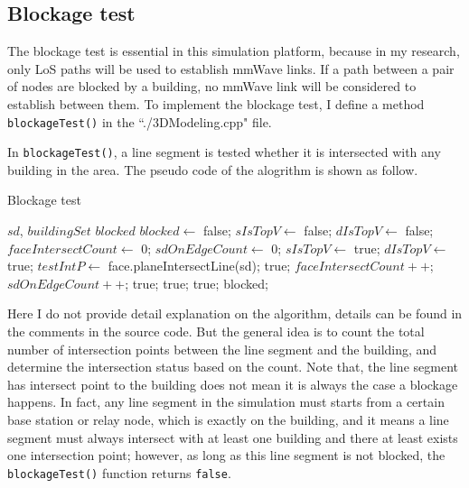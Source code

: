 \documentclass[paper=a4, fontsize=11pt]{scrartcl}
\numberwithin{equation}{section}		%
\numberwithin{figure}{section}			%
\numberwithin{table}{section}				%
\begin{document}
\subsection{Blockage test}
The blockage test is essential in this simulation platform, because in my research, only LoS paths will be used to establish mmWave links. If a path between a pair of nodes are blocked by a building, no mmWave link will be considered to establish between them. To implement the blockage test, I define a method \verb|blockageTest()| in the ``./3DModeling.cpp" file.

In \verb|blockageTest()|, a line segment is tested whether it is intersected with any building in the area. The pseudo code of the alogrithm is shown as follow.
\begin{algorithm}[!ht]
	\caption{Blockage test}
	{\fontsize{10}{10}\selectfont
		\begin{algorithmic}[1]
			\renewcommand{\algorithmicrequire}{\textbf{Input:}}
			\renewcommand{\algorithmicensure}{\textbf{Output:}}
			\REQUIRE $sd$, $buildingSet$
			\ENSURE  $blocked$
			\STATE $blocked \leftarrow$ false;
			\STATE $sIsTopV \leftarrow$ false; $dIsTopV\leftarrow$ false;
			\STATE $faceIntersectCount \leftarrow$ 0; $sdOnEdgeCount \leftarrow$ 0;
			\STATE $sIsTopV \leftarrow$ true;
			\ENDIF
			\STATE $dIsTopV \leftarrow$ true;
			\ENDIF
			\STATE $testIntP \leftarrow$ face.planeIntersectLine(sd);
			\RETURN true;
			\ELSE
			\STATE $faceIntersectCount++$;
			\STATE $sdOnEdgeCount++$;
			\ENDIF
			\ENDIF
			\ENDIF
			\ENDIF
			\ENDFOR
			\RETURN true;
			\ENDIF
			\RETURN true;
			\ENDIF
			\ENDIF
			\RETURN true;
			\ENDIF
			\ENDIF
			\ENDIF
			\ENDFOR
			\RETURN blocked;
		\end{algorithmic}
		}
\end{algorithm}

Here I do not provide detail explanation on the algorithm, details can be found in the comments in the source code. But the general idea is to count the total number of intersection points between the line segment and the building, and determine the intersection status based on the count. Note that, the line segment has intersect point to the building does not mean it is always the case a blockage happens. In fact, any line segment in the simulation must starts from a certain base station or relay node, which is exactly on the building, and it means a line segment must always intersect with at least one building and there at least exists one intersection point; however, as long as this line segment is not blocked, the \verb|blockageTest()| function returns \verb|false|.
\end{document}
